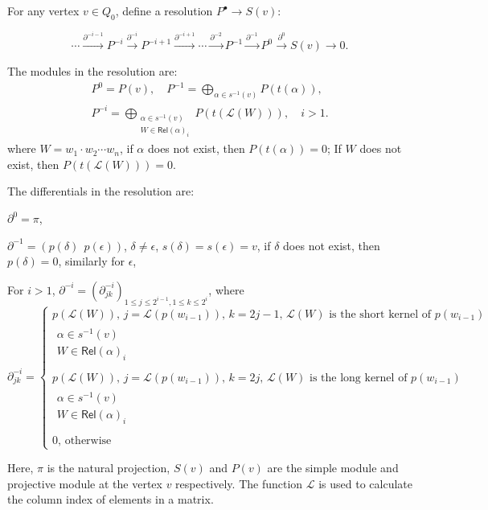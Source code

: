 \documentclass[10pt,a4paper]{amsart}
\begin{document}
\begin{definition}
	For any vertex \( v \in Q_0 \), define a resolution \( P^\bullet \to S(v) \):
	
	\begin{equation} \label{equ:proj}
		\cdots \xrightarrow{\partial^{-i - 1}} P^{-i} \xrightarrow{\partial^{-i}} P^{-i + 1} \xrightarrow{\partial^{-i + 1}} \cdots \xrightarrow{\partial^{-2}} P^{-1} \xrightarrow{\partial^{-1}} P^0 \xrightarrow{\partial^0} S(v) \to 0  \tag{$\divideontimes$}.
	\end{equation}
	

	The modules in the resolution are:
\begin{gather*}
	P^0 = P(v), \quad P^{-1} = \bigoplus_{\alpha \in s^{-1}(v)} P(t(\alpha)), \\
	P^{-i} = \bigoplus_{\substack{\alpha \in s^{-1}(v) \\ W \in \mathsf{Rel}(\alpha)_i}} P(t(\mathscr{L}(W))), \quad i > 1.
\end{gather*}
	where \( W = w_1 \cdot w_2 \cdots w_n \), if \( \alpha \) does not exist, then \( P(t(\alpha)) = 0 \); If \( W \) does not exist, then \( P(t(\mathscr{L}(W))) = 0 \).
	
	The differentials in the resolution are:
	
	$\partial^0 = \pi$,
	 
	$\partial^{-1} = (p(\delta)~~p(\epsilon))$, $\delta \neq \epsilon$, $s(\delta) = s(\epsilon) = v$, if  $\delta$  does not exist, then  $p(\delta) = 0$, similarly for  $\epsilon$,
	
	For \( i > 1 \), \( \partial^{-i} = (\partial^{-i}_{jk})_{1 \leq j \leq 2^{i - 1}, 1 \leq k \leq 2^i} \), where
	\[
	\partial^{-i}_{jk} =
	\begin{cases}
		p(\mathscr{L}(W)), \, j = \mathcal{L}(p(w_{i - 1})), \, k = 2j - 1, \, \mathscr{L}(W) \text{ is the short kernel of } p(w_{i - 1}) \\
		\substack{\alpha \in s^{-1}(v) \\ W \in \mathsf{Rel}(\alpha)_i} \\ \\
		p(\mathscr{L}(W)), \, j = \mathcal{L}(p(w_{i - 1})), \, k = 2j, \, \mathscr{L}(W) \text{ is the long kernel of } p(w_{i - 1}) \\
		\substack{\alpha \in s^{-1}(v) \\ W \in \mathsf{Rel}(\alpha)_i} \\  \\
		0, \, \text{otherwise}
	\end{cases}
	\]
	
	Here, \( \pi \) is the natural projection, \( S(v) \) and \( P(v) \) are the simple module and projective module at the vertex \( v \) respectively. The function $\mathcal{L}$ is used to calculate the column index of elements in a matrix.
\end{definition}
\end{document}
